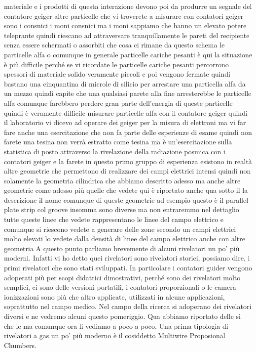 materiale e i prodotti di questa interazione devono poi da produrre un segnale del contatore geiger altre particelle che vi troverete a misurare con contatori geiger sono i consnici i moni consnici ma i moni sappiamo che hanno un elevato potere teleprante quindi riescano ad attraversare tranquillamente le pareti del recipiente senza essere schermati o assorbiti che cosa ci rimane da questo schema le particelle alfa o comunque in generale particelle cariche pesanti è qui la situazione è più difficile perché se vi ricordate le particelle cariche pesanti percorrono spessori di materiale solido veramente piccoli e poi vengono fermate quindi bastano una cinquantina di microle di silicio per arrestare una particella alfa da un mezzo quindi capite che una qualsiasi parete alla fine arresterebbe le particelle alfa comunque farebbero perdere gran parte dell'energia di queste particelle quindi è veramente difficile misurare particelle alfa con il contatore geiger quindi il laboratorio vi dicevo ad operare dei geiger per la misura di elettroni ma vi far fare anche una esercitazione che non fa parte delle esperienze di esame quindi non farete una tesina non verrà estratto come tesina ma è un'esercitazione sulla statistica di posto attraverso la rivelazione della radiazione posmica con i contatori geiger e la farete in questo primo gruppo di esperienza esistono in realtà altre geometrie che permettono di realizzare dei campi elettrici intensi quindi non solamente la geometria cilindrica che abbiamo descritto adesso ma anche altre geometrie come adesso più quelle che vedete qui è riportato anche qua sotto il la descrizione il nome comunque di queste geometrie ad esempio questo è il parallel plate strip col groove insomma sono diverse ma non entraremmo nel dettaglio tutte queste linee che vedete rappresentano le linee del campo elettrico e comunque si riescono vedete a generare delle zone secondo un campi elettrici molto elevati lo vedete dalla densità di linee del campo elettrico anche con altre geometria A questo punto parliamo brevemente di alcuni rivelatori un po' più moderni. Infatti vi ho detto quei rivelatori sono rivelatori storici, possiamo dire, i primi rivelatori che sono stati sviluppati. In particolare i contatori guider vengono adoperati più per scopi didattici dimostrativi, perché sono dei rivelatori molto semplici, ci sono delle versioni portatili, i contatori proporzionali o le camera ionizzazioni sono più che altro applicate, utilizzati in alcune applicazioni, soprattutto nel campo medico. Nel campo della ricerca si adoperano dei rivelatori diversi e ne vedremo alcuni questo pomeriggio. Qua abbiamo riportato delle sì che le ma comunque ora li vediamo a poco a poco. Una prima tipologia di rivelatori a gas un po' più moderno è il cosiddetto Multiwire Proposional Chumbers. 

